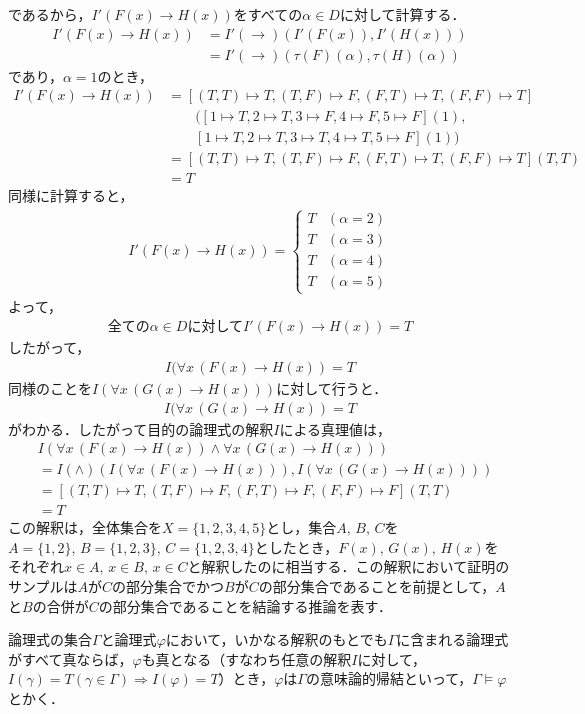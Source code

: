 \documentclass[10pt,b5paper,papersize,dvipdfmx]{jsbook}
\newcommand\fal[1]{\forall#1\,}
\begin{document}
であるから，$I'(F(x)\to H(x))$をすべての$\alpha \in D$に対して計算する．
\begin{align*}
  I'(F(x)\to H(x)) &= I'(\to)(I'(F(x)),I'(H(x)))\\
  &=I'(\to)(\tau(F)(\alpha),\tau(H)(\alpha))
\end{align*}
であり，$\alpha=1$のとき，
\begin{align*}
    I'(F(x)\to H(x))
    &= [(T,T)\mapsto T,(T,F)\mapsto F,(F,T)\mapsto T,(F,F)\mapsto T]\\
      &\qquad ([1\mapsto T,2\mapsto T,3\mapsto F,4\mapsto F,5\mapsto F](1), \\
      &\qquad [1\mapsto T,2\mapsto T,3\mapsto T,4\mapsto T,5\mapsto F](1))\\
    &=[(T,T)\mapsto T,(T,F)\mapsto F,(F,T)\mapsto T,(F,F)\mapsto T](T,T)\\
    &=T
\end{align*}
同様に計算すると，
\begin{align*}
  I'(F(x)\to H(x))=
  \begin{cases}
    T&(\alpha = 2)\\
    T&(\alpha = 3)\\
    T&(\alpha = 4)\\
    T&(\alpha = 5)
  \end{cases}
\end{align*}
よって，
\begin{align*}
  \mbox{全ての}\alpha \in D\mbox{に対して}I'(F(x)\to H(x))=T
\end{align*}
したがって，
\begin{align*}
  I(\fal{x}(F(x)\to H(x))=T
\end{align*}
同様のことを$I(\fal{x}(G(x)\to H(x)))$に対して行うと．
\begin{align*}
  I(\fal{x}(G(x)\to H(x))=T
\end{align*}
がわかる．したがって目的の論理式の解釈$I$による真理値は，
\begin{align*}
  &I(\fal{x}(F(x)\to H(x))\land \fal{x}(G(x)\to H(x)))\\
  &=I(\land)(I(\fal{x}(F(x)\to H(x))),I(\fal{x}(G(x)\to H(x))))\\
  &=[(T,T)\mapsto T,(T,F)\mapsto F,(F,T)\mapsto F,(F,F)\mapsto F](T,T)\\
  &=T
\end{align*}
この解釈は，全体集合を$X=\{1,2,3,4,5\}$とし，集合$A,\, B,\, C$を$A=\{1,2\},\, B=\{1,2,3\},\, C=\{1,2,3,4\}$としたとき，$F(x),\, G(x),\, H(x)$をそれぞれ$x\in A,\, x\in B,\, x\in C$と解釈したのに相当する．この解釈において証明のサンプルは$A$が$C$の部分集合でかつ$B$が$C$の部分集合であることを前提として，$A$と$B$の合併が$C$の部分集合であることを結論する推論を表す．\par
論理式の集合$\Gamma$と論理式$\varphi$において，いかなる解釈のもとでも$\Gamma$に含まれる論理式がすべて真ならば，$\varphi$も真となる（すなわち任意の解釈$I$に対して，$I(\gamma)=T(\gamma \in \Gamma)\Rightarrow I(\varphi)=T$）とき，$\varphi$は$\Gamma$の意味論的帰結といって，$\Gamma \models \varphi$とかく．
\end{document}

